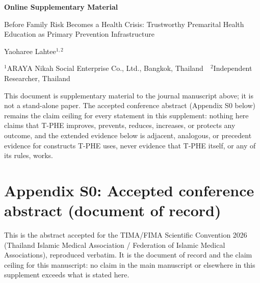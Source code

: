 \documentclass[11pt]{article}
\newcommand{\tphe}{T\mbox{-}PHE}
\begin{document}
\begin{center}
{\LARGE\bfseries\color{ocsi} Online Supplementary Material}\par\vspace{2mm}
{\large Before Family Risk Becomes a Health Crisis: Trustworthy Premarital Health Education as Primary Prevention Infrastructure}\par\vspace{2mm}
{\normalsize Yaoharee Lahtee$^{1,2}$}\par
{\small $^{1}$ARAYA Nikah Social Enterprise Co., Ltd., Bangkok, Thailand \,\textbullet\, $^{2}$Independent Researcher, Thailand}\par
\end{center}
\vspace{2mm}
\begin{center}
\begin{minipage}{0.92\textwidth}
\footnotesize
\noindent This document is supplementary material to the journal manuscript above; it is not a stand-alone paper. The accepted conference abstract (Appendix S0 below) remains the claim ceiling for every statement in this supplement: nothing here claims that \tphe{} improves, prevents, reduces, increases, or protects any outcome, and the extended evidence below is adjacent, analogous, or precedent evidence for constructs \tphe{} uses, never evidence that \tphe{} itself, or any of its rules, works.
\end{minipage}
\end{center}
\vspace{4mm}

\section*{Appendix S0: Accepted conference abstract (document of record)}
\footnotesize
\noindent This is the abstract accepted for the TIMA/FIMA Scientific Convention 2026 (Thailand Islamic Medical Association / Federation of Islamic Medical Associations), reproduced verbatim. It is the document of record and the claim ceiling for this manuscript: no claim in the main manuscript or elsewhere in this supplement exceeds what is stated here.
\end{document}
